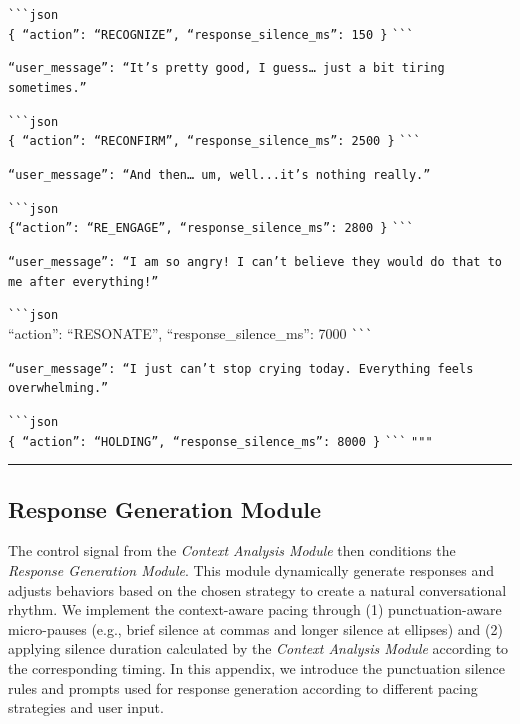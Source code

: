 \noindent\texttt{\`{}\`{}\`{}json} \\
\texttt{\{ ``action'': ``RECOGNIZE'', ``response\_silence\_ms'': 150 \}}
\noindent\texttt{\`{}\`{}\`{}} 

\noindent\texttt{``user\_message'': ``It’s pretty good, I guess… just a bit tiring sometimes.''}

\noindent\texttt{\`{}\`{}\`{}json} \\
\texttt{\{ ``action'': ``RECONFIRM'', ``response\_silence\_ms'': 2500 \}}
\noindent\texttt{\`{}\`{}\`{}} 

\noindent\texttt{``user\_message'': ``And then… um, well...it’s nothing really.''}

\noindent\texttt{\`{}\`{}\`{}json} \\
\texttt{\{``action'': ``RE\_ENGAGE'', ``response\_silence\_ms'': 2800 \}}
\noindent\texttt{\`{}\`{}\`{}}

\noindent\texttt{``user\_message'': ``I am so angry! I can't believe they would do that to me after everything!''}

\noindent\texttt{\`{}\`{}\`{}json} \\
{{ ``action'': ``RESONATE'', ``response\_silence\_ms'': 7000 }}
\noindent\texttt{\`{}\`{}\`{}}

\noindent\texttt{``user\_message'': ``I just can't stop crying today. Everything feels overwhelming.''}

\noindent\texttt{\`{}\`{}\`{}json} \\
\texttt{\{ ``action'': ``HOLDING'', ``response\_silence\_ms'': 8000 \}}
\noindent\texttt{\`{}\`{}\`{}}
\texttt{"""}


\noindent\rule{\linewidth}{0.2pt}


\subsection{Response Generation Module}

The control signal from the \emph{Context Analysis Module} then conditions the \emph{Response Generation Module}. This module dynamically generate responses and adjusts behaviors based on the chosen strategy to create a natural conversational rhythm. We implement the context-aware pacing through (1) punctuation-aware micro-pauses (e.g., brief silence at commas and longer silence at ellipses) and (2) applying silence duration calculated by the \emph{Context Analysis Module} according to the corresponding timing. In this appendix, we introduce the punctuation silence rules and prompts used for response generation according to different pacing strategies and user input.

